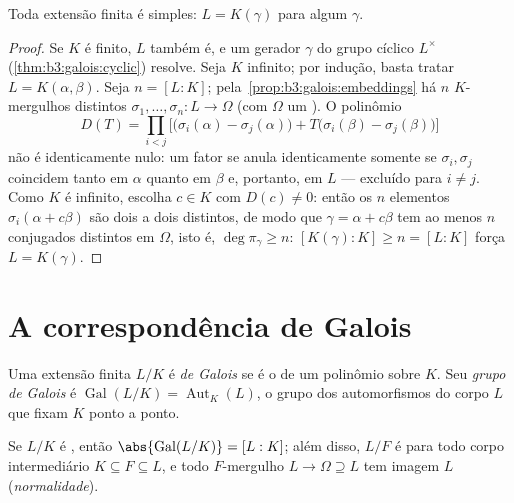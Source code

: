 \begin{theorem}\label{thm:b3:galois:primitive}
Toda extensão finita \emph{} é simples: $L =
K(\gamma)$ para algum
$\gamma$.
\end{theorem}

\begin{proof}
Se $K$ é finito, $L$ também é, e um gerador $\gamma$ do
grupo cíclico $L^\times$ (\cref{thm:b3:galois:cyclic}) resolve. Seja $K$ infinito;
por indução, basta tratar $L =
K(\alpha, \beta)$. Seja $n = [L:K]$; pela~\cref{prop:b3:galois:embeddings} há
$n$ $K$-mergulhos distintos $\sigma_1, \dots, \sigma_n \colon L \to \Omega$ (com $\Omega$ um ). O polinômio
\[
D(T)=\prod_{i<j}\bigl[\bigl(\sigma_i(\alpha)-\sigma_j(\alpha)
\bigr) + T\bigl(\sigma_i(\beta) - \sigma_j(\beta)\bigr)\bigr]
\]
não é identicamente nulo: um fator se anula identicamente somente se
$\sigma_i, \sigma_j$ coincidem tanto em $\alpha$ quanto em $\beta$ e,
portanto, em $L$ --- excluído para $i \neq j$. Como $K$ é infinito,
escolha $c \in
K$ com $D(c) \ne 0$: então os $n$ elementos $\sigma_i(\alpha +
c\beta)$ são dois a
dois distintos, de modo que $\gamma = \alpha + c\beta$ tem ao menos $n$ conjugados
distintos em $\Omega$, isto é, $\deg \pi_\gamma \geq n$: $[K(\gamma):K] \geq n = [L:K]$ força $L = K(\gamma)$.
\end{proof}

\section{A correspondência de Galois}

\begin{definition}\label{def:b3:galois:galois}
Uma extensão finita $L/K$ é \emph{de Galois} se é o  de um polinômio \emph{}
sobre $K$. Seu \emph{grupo de Galois} é
$\operatorname{Gal}(L/K) = \operatorname{Aut}_K(L)$, o grupo dos automorfismos do corpo $L$ que fixam $K$
ponto a ponto.
\end{definition}

\begin{proposition}\label{prop:b3:galois:galoisorder}
Se $L/K$ é , então $\abs{\operatorname{Gal}(L/K)} =
[L:K]$; além disso, $L/F$ é  para todo corpo intermediário $K
\subseteq F \subseteq L$, e todo $F$-mergulho
$L \to \Omega
\supseteq L$ tem imagem $L$ (\emph{normalidade}).
\end{proposition}

